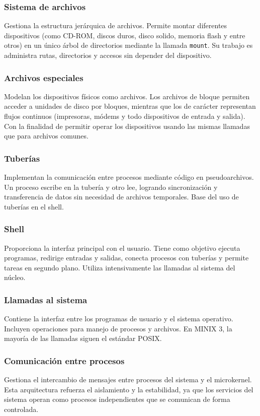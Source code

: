 \subsubsection*{Sistema de archivos}
Gestiona la estructura jerárquica de archivos. Permite montar diferentes dispositivos (como CD-ROM, discos duros, disco solido, memoria flash y entre otros) en un único árbol de directorios mediante la llamada \texttt{mount}. Su trabajo es administra rutas, directorios y accesos sin depender del dispositivo.
\subsubsection*{Archivos especiales}
 Modelan los dispositivos físicos como archivos. Los archivos de bloque permiten acceder a unidades de disco por bloques, mientras que los de carácter representan flujos continuos (impresoras, módems y todo dispositivos de entrada y salida). Con la finalidad de permitir operar los dispositivos usando las mismas llamadas que para archivos comunes.
\subsubsection*{Tuberías}
Implementan la comunicación entre procesos mediante código en  pseudoarchivos. Un proceso escribe en la tubería y otro lee, logrando sincronización y transferencia de datos sin necesidad de archivos temporales. Base del uso de tuberías en el shell.
\subsubsection*{Shell}
Proporciona la interfaz principal con el usuario. Tiene como objetivo ejecuta programas, redirige entradas y salidas, conecta procesos con tuberías y permite tareas en segundo plano. Utiliza intensivamente las llamadas al sistema del núcleo.
\subsubsection*{Llamadas al sistema}
 Contiene la interfaz entre los programas de usuario y el sistema operativo. Incluyen operaciones para manejo de procesos y archivos. En MINIX 3, la mayoría de las llamadas siguen el estándar POSIX.
\subsubsection*{Comunicación entre procesos}
Gestiona el intercambio de mensajes entre procesos del sistema y el microkernel. Esta arquitectura refuerza el aislamiento y la estabilidad, ya que los servicios del sistema operan como procesos independientes que se comunican de forma controlada.

